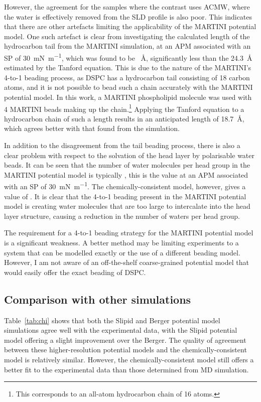 However, the agreement for the samples where the contrast uses ACMW, where the water is effectively removed from the SLD profile is also poor.
This indicates that there are other artefacts limiting the applicability of the MARTINI potential model.
One such artefact is clear from investigating the calculated length of the hydrocarbon tail from the MARTINI simulation, at an APM associated with an SP of \SI{30}{\milli\newton\per\meter}, which was found to be ~\si{\angstrom}, significantly less than the \SI{24.3}{\angstrom} estimated by the Tanford equation.
This is due to the nature of the MARTINI's 4-to-1 beading process, as DSPC has a hydrocarbon tail consisting of 18 carbon atoms, and it is not possible to bead such a chain accurately with the MARTINI potential model.
In this work, a MARTINI phospholipid molecule was used with 4 MARTINI beads making up the chain.\footnote{This corresponds to an all-atom hydrocarbon chain of 16 atoms.}
Applying the Tanford equation to a hydrocarbon chain of such a length results in an anticipated length of \SI{18.7}{\angstrom}, which agrees better with that found from the simulation.

In addition to the disagreement from the tail beading process, there is also a clear problem with respect to the solvation of the head layer by polarisable water beads.
It can be seen that the number of water molecules per head group in the MARTINI potential model is typically , this is the value at an APM associated with an SP of \SI{30}{\milli\newton\per\meter}.
The chemically-consistent model, however, gives a value of .
It is clear that the 4-to-1 beading present in the MARTINI potential model is creating water molecules that are too large to intercalate into the head layer structure, causing a reduction in the number of waters per head group.

The requirement for a 4-to-1 beading strategy for the MARTINI potential model is a significant weakness.
A better method may be limiting experiments to a system that can be modelled exactly or the use of a different beading model.
However, I am not aware of an off-the-shelf coarse-grained potential model that would easily offer the exact beading of DSPC.

\subsection{Comparison with other simulations}
Table~\ref{tab:chi} shows that both the Slipid and Berger potential model simulations agree well with the experimental data, with the Slipid potential model offering a slight improvement over the Berger.
The quality of agreement between these higher-resolution potential models and the chemically-consistent model is relatively similar.
However, the chemically-consistent model still offers a better fit to the experimental data than those determined from MD simulation.

